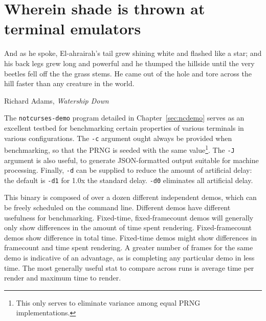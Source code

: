 \section{Wherein shade is thrown at terminal emulators}
\label{sec:termshade}
\epigraph{And as he spoke, El-ahrairah's tail grew shining white and flashed like a star;
and his back legs grew long and powerful and he thumped the hillside until the
very beetles fell off the the grass stems. He came out of the hole and tore across
the hill faster than any creature in the world.}{Richard Adams, \textit{Watership Down}}
The \texttt{notcurses-demo} program detailed in Chapter~\ref{sec:ncdemo} serves
as an excellent testbed for benchmarking certain properties of various
terminals in various configurations. The \texttt{-c} argument ought always be
provided when benchmarking, so that the PRNG is seeded with the same
value\footnote{This only serves to eliminate variance among equal PRNG
implementations.}. The \texttt{-J} argument is also useful, to generate JSON-formatted
output suitable for machine processing. Finally, \texttt{-d} can be supplied
to reduce the amount of artificial delay: the default is \texttt{-d1} for 1.0x
the standard delay. \texttt{-d0} eliminates all artificial delay.

This binary is composed of over a dozen
different independent demos, which can be freely scheduled on the command line.
Different demos have different usefulness for benchmarking. Fixed-time, fixed-framecount
demos will generally only show differences in the amount of time spent
rendering. Fixed-framecount demos show difference in total time. Fixed-time demos
might show differences in framecount and time spent rendering. A greater
number of frames for the same demo is indicative of an advantage, as is completing
any particular demo in less time. The most generally useful stat to compare
across runs is average time per render and maximum time to render.

